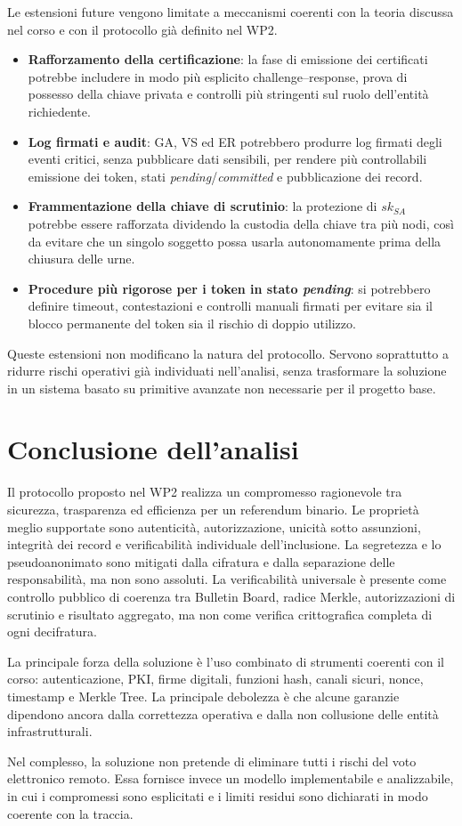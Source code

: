 \documentclass[a4paper,12pt]{article}
\begin{document}
Le estensioni future vengono limitate a meccanismi coerenti con la teoria discussa nel corso e con il protocollo già definito nel WP2.

\begin{itemize}
    \item \textbf{Rafforzamento della certificazione}: la fase di emissione dei certificati potrebbe includere in modo più esplicito challenge--response, prova di possesso della chiave privata e controlli più stringenti sul ruolo dell'entità richiedente.
    \item \textbf{Log firmati e audit}: GA, VS ed ER potrebbero produrre log firmati degli eventi critici, senza pubblicare dati sensibili, per rendere più controllabili emissione dei token, stati \emph{pending}/\emph{committed} e pubblicazione dei record.
    \item \textbf{Frammentazione della chiave di scrutinio}: la protezione di \(sk_{SA}\) potrebbe essere rafforzata dividendo la custodia della chiave tra più nodi, così da evitare che un singolo soggetto possa usarla autonomamente prima della chiusura delle urne.
    \item \textbf{Procedure più rigorose per i token in stato \emph{pending}}: si potrebbero definire timeout, contestazioni e controlli manuali firmati per evitare sia il blocco permanente del token sia il rischio di doppio utilizzo.
\end{itemize}

Queste estensioni non modificano la natura del protocollo. Servono soprattutto a ridurre rischi operativi già individuati nell'analisi, senza trasformare la soluzione in un sistema basato su primitive avanzate non necessarie per il progetto base.

\section{Conclusione dell'analisi}

Il protocollo proposto nel WP2 realizza un compromesso ragionevole tra sicurezza, trasparenza ed efficienza per un referendum binario.
Le proprietà meglio supportate sono autenticità, autorizzazione, unicità sotto assunzioni, integrità dei record e verificabilità individuale dell'inclusione.
La segretezza e lo pseudoanonimato sono mitigati dalla cifratura e dalla separazione delle responsabilità, ma non sono assoluti.
La verificabilità universale è presente come controllo pubblico di coerenza tra Bulletin Board, radice Merkle, autorizzazioni di scrutinio e risultato aggregato, ma non come verifica crittografica completa di ogni decifratura.

La principale forza della soluzione è l'uso combinato di strumenti coerenti con il corso: autenticazione, PKI, firme digitali, funzioni hash, canali sicuri, nonce, timestamp e Merkle Tree.
La principale debolezza è che alcune garanzie dipendono ancora dalla correttezza operativa e dalla non collusione delle entità infrastrutturali.

Nel complesso, la soluzione non pretende di eliminare tutti i rischi del voto elettronico remoto.
Essa fornisce invece un modello implementabile e analizzabile, in cui i compromessi sono esplicitati e i limiti residui sono dichiarati in modo coerente con la traccia.
\end{document}
